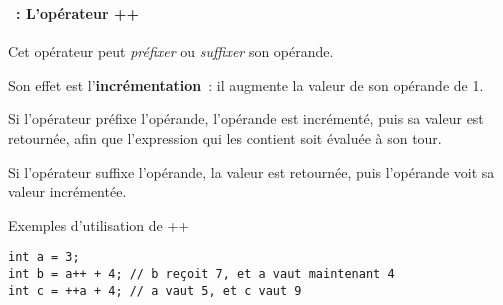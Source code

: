 \begin{frame}[containsverbatim]
  \frametitle{\secname}
  \framesubtitle{\subsecname~: L'opérateur ++} 
  
  Cet opérateur peut \textit{préfixer} ou \textit{suffixer} son opérande. 
  \vspace{0.3cm}
  \par
  Son effet est l'\textbf{incrémentation}~: il augmente la valeur de son opérande de 1.
  \vspace{0.3cm}
  \par
  Si l'opérateur préfixe l'opérande, l'opérande est incrémenté, puis sa valeur est retournée, afin que l'expression qui les contient soit évaluée à son tour.
  \vspace{0.3cm}
  \par
  Si l'opérateur suffixe l'opérande, la valeur est retournée, puis l'opérande voit sa valeur incrémentée.
  \vspace{0.3cm}
  \begin{exampleblock}{Exemples d'utilisation de ++}
    \begin{verbatim}
int a = 3;
int b = a++ + 4; // b reçoit 7, et a vaut maintenant 4
int c = ++a + 4; // a vaut 5, et c vaut 9\end{verbatim}        
  \end{exampleblock}
\end{frame}

